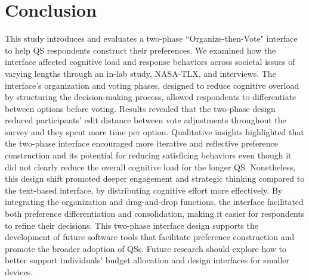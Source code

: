 \section{Conclusion}
This study introduces and evaluates a two-phase ``Organize-then-Vote" interface to help QS respondents construct their preferences. We examined how the interface affected cognitive load and response behaviors across societal issues of varying lengths through an in-lab study, NASA-TLX, and interviews. The interface's organization and voting phases, designed to reduce cognitive overload by structuring the decision-making process, allowed respondents to differentiate between options before voting. Results revealed that the two-phase design reduced participants' edit distance between vote adjustments throughout the survey and they spent more time per option. Qualitative insights highlighted that the two-phase interface encouraged more iterative and reflective preference construction and its potential for reducing satisficing behaviors even though it did not clearly reduce the overall cognitive load for the longer QS. Nonetheless, this design shift promoted deeper engagement and strategic thinking compared to the text-based interface, by distributing cognitive effort more effectively. By integrating the organization and drag-and-drop functions, the interface facilitated both preference differentiation and consolidation, making it easier for respondents to refine their decisions. This two-phase interface design supports the development of future software tools that facilitate preference construction and promote the broader adoption of QSs. Future research should explore how to better support individuals' budget allocation and design interfaces for smaller devices.
